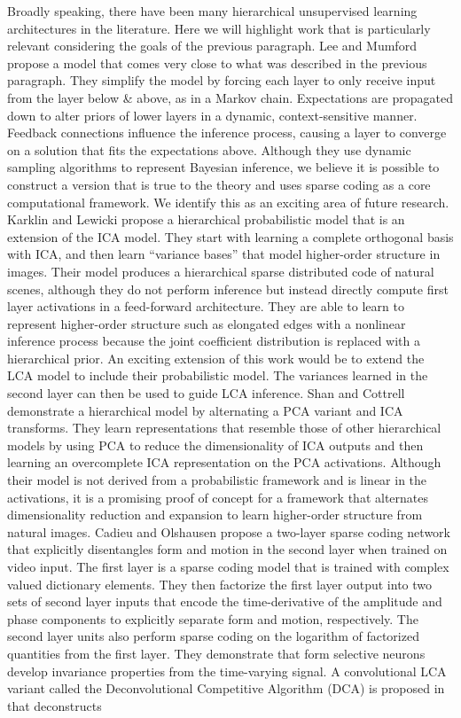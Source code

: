 Broadly speaking, there have been many hierarchical unsupervised learning architectures in the literature. Here we will highlight work that is particularly relevant considering the goals of the previous paragraph. Lee and Mumford \citeyearpar{lee2003hierarchical} propose a model that comes very close to what was described in the previous paragraph. They simplify the model by forcing each layer to only receive input from the layer below & above, as in a Markov chain. Expectations are propagated down to alter priors of lower layers in a dynamic, context-sensitive manner. Feedback connections influence the inference process, causing a layer to converge on a solution that fits the expectations above. Although they use dynamic sampling algorithms to represent Bayesian inference, we believe it is possible to construct a version that is true to the theory and uses sparse coding as a core computational framework. We identify this as an exciting area of future research. Karklin and Lewicki \citeyearpar{karklin2003learning} propose a hierarchical probabilistic model that is an extension of the ICA model. They start with learning a complete orthogonal basis with ICA, and then learn ``variance bases'' that model higher-order structure in images. Their model produces a hierarchical sparse distributed code of natural scenes, although they do not perform inference but instead directly compute first layer activations in a feed-forward architecture. They are able to learn to represent higher-order structure such as elongated edges with a nonlinear inference process because the joint coefficient distribution is replaced with a hierarchical prior. An exciting extension of this work would be to extend the LCA model to include their probabilistic model. The variances learned in the second layer can then be used to guide LCA inference. Shan and Cottrell \citeyearpar{shan2013efficient}  demonstrate a hierarchical model by alternating a PCA variant and ICA transforms. They learn representations that resemble those of other hierarchical models by using PCA to reduce the dimensionality of ICA outputs and then learning an overcomplete ICA \parencite{le2011ica} representation on the PCA activations. Although their model is not derived from a probabilistic framework and is linear in the activations, it is a promising proof of concept for a framework that alternates dimensionality reduction and expansion to learn higher-order structure from natural images. Cadieu and Olshausen \citeyearpar{cadieu2008learning} propose a two-layer sparse coding network that explicitly disentangles form and motion in the second layer when trained on video input. The first layer is a sparse coding model that is trained with complex valued dictionary elements. They then factorize the first layer output into two sets of second layer inputs that encode the time-derivative of the amplitude and phase components to explicitly separate form and motion, respectively. The second layer units also perform sparse coding on the logarithm of factorized quantities from the first layer. They demonstrate that form selective neurons develop invariance properties from the time-varying signal. A convolutional LCA variant called the Deconvolutional Competitive Algorithm (DCA) is proposed in \parencite{paiton2015deconvolutional} that deconstructs 